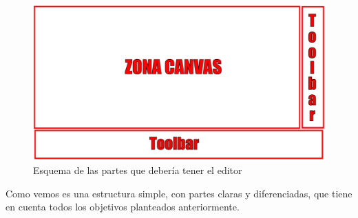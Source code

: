\begin{figure}[!h]
    \centering
    \includegraphics[scale=0.30]{img/ESQUEMA_ABSTRACTO.png}
    \caption{Esquema de las partes que debería tener el editor}
\end{figure}

Como vemos es una estructura simple, con partes claras y diferenciadas, 
que tiene en cuenta todos los objetivos planteados anteriormente.